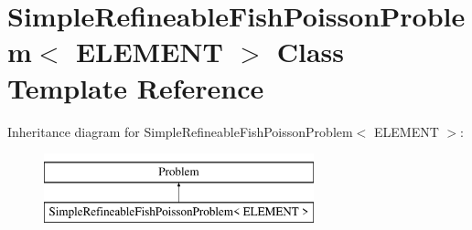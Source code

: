 \hypertarget{classSimpleRefineableFishPoissonProblem}{}\section{Simple\+Refineable\+Fish\+Poisson\+Problem$<$ E\+L\+E\+M\+E\+NT $>$ Class Template Reference}
\label{classSimpleRefineableFishPoissonProblem}
Inheritance diagram for Simple\+Refineable\+Fish\+Poisson\+Problem$<$ E\+L\+E\+M\+E\+NT $>$\+:\begin{figure}[H]
\begin{center}
\leavevmode
\includegraphics[height=2.000000cm]{classSimpleRefineableFishPoissonProblem}
\end{center}
\end{figure}
